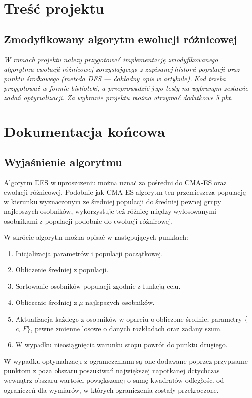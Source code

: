 \chapter{Treść projektu}
\section{Zmodyfikowany algorytm ewolucji różnicowej}
\textit{W ramach projektu należy przygotować implementację zmodyfikowanego algorytmu ewolucji różnicowej korzystającego z zapisanej historii populacji oraz punktu środkowego (metoda DES --- dokładny opis w artykule). Kod trzeba przygotować w formie biblioteki, a przeprowadzić jego testy na wybranym zestawie zadań optymalizacji. Za wybranie projektu można otrzymać dodatkowe 5 pkt.}

\chapter{Dokumentacja końcowa}
\section{Wyjaśnienie algorytmu}
Algorytm DES w uproszczeniu można uznać za pośredni do CMA-ES oraz ewolucji różnicowej. Podobnie jak CMA-ES algorytm ten przemieszcza populację w kierunku wyznaczonym ze średniej populacji do średniej pewnej grupy najlepszych osobników, wykorzystuje też różnicę między wylosowanymi osobnikami z populacji podobnie do ewolucji różnicowej.

W skrócie algorytm można opisać w następujących punktach:

\begin{enumerate}
    \item Inicjalizacja parametrów i populacji początkowej.
    \item Obliczenie średniej z populacji.
    \item Sortowanie osobników populacji zgodnie z funkcją celu.
    \item Obliczenie średniej z $\mu$ najlepszych osobników.
    \item Aktualizacja każdego z osobników w oparciu o obliczone średnie, parametry \{$c$, $F$\}, pewne zmienne losowe o danych rozkładach oraz zadany szum.
    \item W wypadku nieosiągnięcia warunku stopu powrót do punktu drugiego.
\end{enumerate}

W wypadku optymalizacji z ograniczeniami są one dodawane poprzez przypisanie punktom z poza obszaru poszukiwań największej napotkanej dotychczas wewnątrz obszaru wartości powiększonej o sumę kwadratów odległości od ograniczeń dla wymiarów, w których ograniczenia zostały przekroczone.

